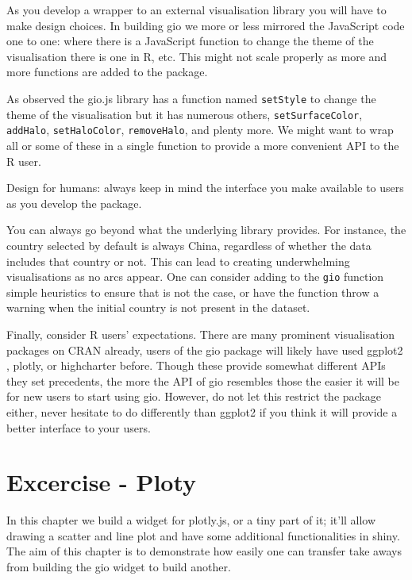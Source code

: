 \documentclass[
]{krantz}
\makeatletter
\newenvironment{kframe}{%
\medskip{}
\setlength{\fboxsep}{.8em}
 \def\at@end@of@kframe{}%
 \ifinner\ifhmode%
  \def\at@end@of@kframe{\end{minipage}}%
  \begin{minipage}{\columnwidth}%
 \fi\fi%
 \def\FrameCommand##1{\hskip\@totalleftmargin \hskip-\fboxsep
 \colorbox{shadecolor}{##1}\hskip-\fboxsep
     \hskip-\linewidth \hskip-\@totalleftmargin \hskip\columnwidth}%
 \MakeFramed {\advance\hsize-\width
   \@totalleftmargin\z@ \linewidth\hsize
   \@setminipage}}%
 {\par\unskip\endMakeFramed%
 \at@end@of@kframe}
\newenvironment{rmdblock}[1]
  {
  \begin{itemize}
  \renewcommand{\labelitemi}{
    \raisebox{-.7\height}[0pt][0pt]{
      {\setkeys{Gin}{width=3em,keepaspectratio}\texttt{[image: images/\#1]}}
    }
  }
  \setlength{\fboxsep}{1em}
  \begin{kframe}
  \item
  }
  {
  \end{kframe}
  \end{itemize}
  }
\newenvironment{rmdnote}
  {\begin{rmdblock}{note}}
  {\end{rmdblock}}
\makeatother
\begin{document}
As you develop a wrapper to an external visualisation library you will have to make design choices. In building gio we more or less mirrored the JavaScript code one to one: where there is a JavaScript function to change the theme of the visualisation there is one in R, etc. This might not scale properly as more and more functions are added to the package.

As observed the gio.js library has a function named \texttt{setStyle} to change the theme of the visualisation but it has numerous others, \texttt{setSurfaceColor}, \texttt{addHalo}, \texttt{setHaloColor}, \texttt{removeHalo}, and plenty more. We might want to wrap all or some of these in a single function to provide a more convenient API to the R user.

\begin{rmdnote}
Design for humans: always keep in mind the interface you make available
to users as you develop the package.
\end{rmdnote}

You can always go beyond what the underlying library provides. For instance, the country selected by default is always China, regardless of whether the data includes that country or not. This can lead to creating underwhelming visualisations as no arcs appear. One can consider adding to the \texttt{gio} function simple heuristics to ensure that is not the case, or have the function throw a warning when the initial country is not present in the dataset.

Finally, consider R users' expectations. There are many prominent visualisation packages on CRAN already, users of the gio package will likely have used ggplot2 \citep{R-ggplot2}, plotly, or highcharter before. Though these provide somewhat different APIs they set precedents, the more the API of gio resembles those the easier it will be for new users to start using gio. However, do not let this restrict the package either, never hesitate to do differently than ggplot2 if you think it will provide a better interface to your users.

\hypertarget{excercise---ploty}{%
\chapter{Excercise - Ploty}\label{excercise---ploty}}

In this chapter we build a widget for plotly.js, or a tiny part of it; it'll allow drawing a scatter and line plot and have some additional functionalities in shiny. The aim of this chapter is to demonstrate how easily one can transfer take aways from building the gio widget to build another.
\end{document}
